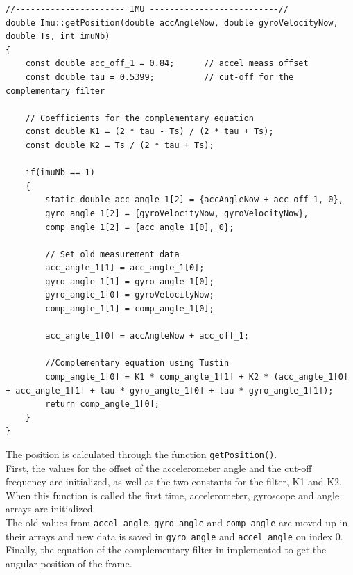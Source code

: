 \begin{lstlisting}[caption  = {Code for the implementation of the complementary filter in C\texttt{++}},
				label    = codeCompFilter ]
//---------------------- IMU --------------------------//
double Imu::getPosition(double accAngleNow, double gyroVelocityNow, double Ts, int imuNb)
{
	const double acc_off_1 = 0.84;  	// accel meass offset
	const double tau = 0.5399;			// cut-off for the complementary filter

	// Coefficients for the complementary equation
	const double K1 = (2 * tau - Ts) / (2 * tau + Ts);
	const double K2 = Ts / (2 * tau + Ts);

	if(imuNb == 1) 
	{
		static double acc_angle_1[2] = {accAngleNow + acc_off_1, 0},
		gyro_angle_1[2] = {gyroVelocityNow, gyroVelocityNow},
		comp_angle_1[2] = {acc_angle_1[0], 0};

		// Set old measurement data
		acc_angle_1[1] = acc_angle_1[0];
		gyro_angle_1[1] = gyro_angle_1[0];
		gyro_angle_1[0] = gyroVelocityNow;
		comp_angle_1[1] = comp_angle_1[0];

		acc_angle_1[0] = accAngleNow + acc_off_1;

		//Complementary equation using Tustin
		comp_angle_1[0] = K1 * comp_angle_1[1] + K2 * (acc_angle_1[0] + acc_angle_1[1] + tau * gyro_angle_1[0] + tau * gyro_angle_1[1]);
		return comp_angle_1[0];
	}
}

\end{lstlisting}

The position is calculated through the function \texttt{getPosition()}. \\
First, the values for the offset of the accelerometer angle and the cut-off frequency are initialized, as well as the two constants for the filter, K1 and K2.\\
When this function is called the first time, accelerometer, gyroscope and angle arrays are initialized.\\
The old values from \texttt{accel\_angle}, \texttt{gyro\_angle} and \texttt{comp\_angle} are moved up in their arrays and new data is saved in \texttt{gyro\_angle} and \texttt{accel\_angle} on index 0. \\
Finally, the equation of the complementary filter in implemented to get the angular position of the frame.
